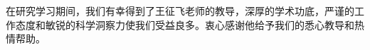 
\begin{acknowledgements}

    在研究学习期间，我们有幸得到了王征飞老师的教导，深厚的学术功底，严谨的工作态度和敏锐的科学洞察力使我们受益良多。衷心感谢他给予我们的悉心教导和热情帮助。

\end{acknowledgements}
